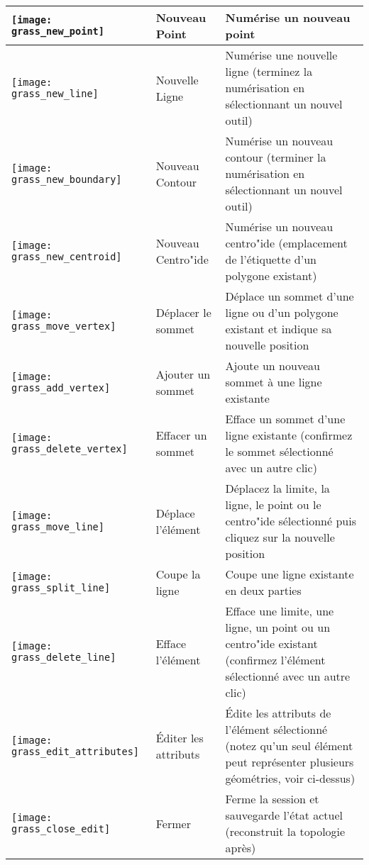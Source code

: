 \begin{table}[h]
\begin{tabular}{|l|l|p{5in}|}
\hline \texttt{[image: grass\_new\_point]} & Nouveau Point & Num\'erise un nouveau point \\
\hline \texttt{[image: grass\_new\_line]} & Nouvelle Ligne & Num\'erise une nouvelle ligne (terminez la num\'erisation en s\'electionnant un nouvel outil) \\
\hline \texttt{[image: grass\_new\_boundary]} & Nouveau Contour & Num\'erise un nouveau contour (terminer la num\'erisation en s\'electionnant un nouvel outil)\\
\hline \texttt{[image: grass\_new\_centroid]} & Nouveau Centro"ide & Num\'erise un nouveau centro"ide (emplacement de l'\'etiquette d'un polygone existant)\\
\hline \texttt{[image: grass\_move\_vertex]} & D\'eplacer le sommet & D\'eplace un sommet d'une ligne ou d'un polygone existant et indique sa nouvelle position\\
\hline \texttt{[image: grass\_add\_vertex]} & Ajouter un sommet & Ajoute un nouveau sommet \`a une ligne existante\\
\hline \texttt{[image: grass\_delete\_vertex]} & Effacer un sommet & Efface un sommet d'une ligne existante (confirmez le sommet s\'electionn\'e avec un autre clic)\\
\hline \texttt{[image: grass\_move\_line]} & D\'eplace l'\'el\'ement & D\'eplacez la limite, la ligne, le point ou le centro"ide s\'electionn\'e puis cliquez sur la nouvelle position\\
\hline \texttt{[image: grass\_split\_line]} & Coupe la ligne & Coupe une ligne existante en deux parties\\
\hline \texttt{[image: grass\_delete\_line]} & Efface l'\'el\'ement & Efface une limite, une ligne, un point ou un centro"ide existant (confirmez l'\'el\'ement s\'electionn\'e avec un autre clic)\\
\hline \texttt{[image: grass\_edit\_attributes]} & \'Editer les attributs & \'Edite les attributs de l'\'el\'ement s\'electionn\'e (notez qu'un seul \'el\'ement peut repr\'esenter plusieurs g\'eom\'etries, voir ci-dessus)\\
\hline \texttt{[image: grass\_close\_edit]} & Fermer & Ferme la session et sauvegarde l'\'etat actuel (reconstruit la topologie apr\`es)\\
\hline
\end{tabular}
\end{table}

